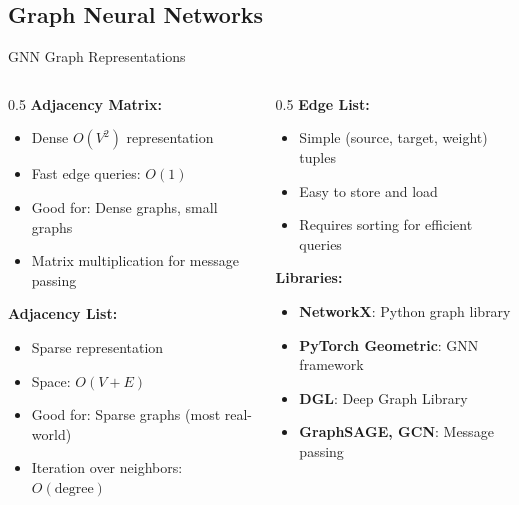 \documentclass[aspectratio=169,xcolor=dvipsnames]{beamer}
\begin{document}
\subsection{Graph Neural Networks}

\begin{frame}{GNN Graph Representations}
  \begin{columns}
    \begin{column}{0.5\textwidth}
      \textbf{Adjacency Matrix:}
      \begin{itemize}
        \item Dense $O(V^2)$ representation
        \item Fast edge queries: $O(1)$
        \item Good for: Dense graphs, small graphs
        \item Matrix multiplication for message passing
      \end{itemize}

      \vspace{0.3cm}
      \textbf{Adjacency List:}
      \begin{itemize}
        \item Sparse representation
        \item Space: $O(V + E)$
        \item Good for: Sparse graphs (most real-world)
        \item Iteration over neighbors: $O(\text{degree})$
      \end{itemize}
    \end{column}

    \begin{column}{0.5\textwidth}
      \textbf{Edge List:}
      \begin{itemize}
        \item Simple (source, target, weight) tuples
        \item Easy to store and load
        \item Requires sorting for efficient queries
      \end{itemize}

      \vspace{0.3cm}
      \textbf{Libraries:}
      \begin{itemize}
        \item \textbf{NetworkX}: Python graph library
        \item \textbf{PyTorch Geometric}: GNN framework
        \item \textbf{DGL}: Deep Graph Library
        \item \textbf{GraphSAGE, GCN}: Message passing
      \end{itemize}


\end{column}
\end{columns}
\end{frame}
\end{document}
